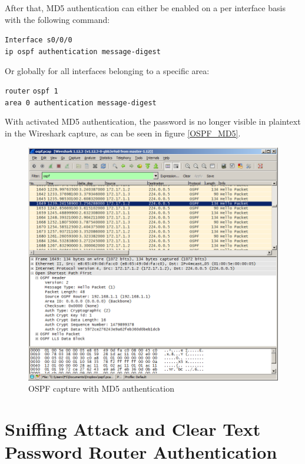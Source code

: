 After that, MD5 authentication can either be enabled on a per interface basis with the following command:
\begin{tabbing}
\texttt{Interf}\= \texttt{ace s0/0/0} \\
\> \texttt{ip ospf authentication message-digest}
\end{tabbing}
   
Or globally for all interfaces belonging to a specific area:
\begin{tabbing}
\texttt{router} \= \texttt{ospf 1} \\
\> \texttt{area 0 authentication message-digest}
\end{tabbing}

With activated MD5 authentication, the password is no longer visible in plaintext in the Wireshark capture, as can be seen in figure \ref{OSPF_MD5}.

\begin{figure}[H]
	\centering
	\includegraphics[width=1.0\textwidth]{img/wireshark_md5.png}
	\caption{OSPF capture with MD5 authentication}
	\label{img:OSPF_MD5}
\end{figure}




\chapter{Sniffing Attack and Clear Text Password Router Authentication}

